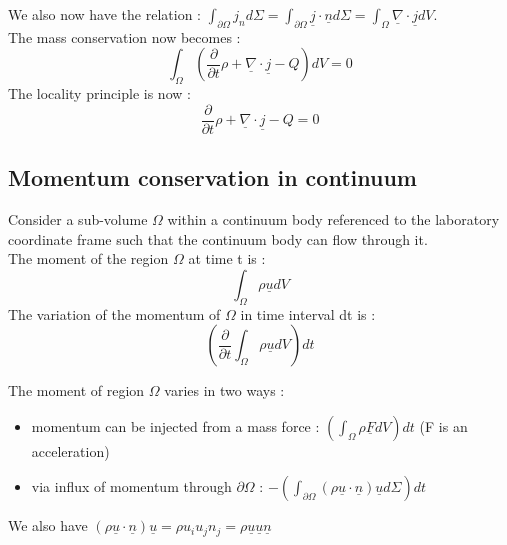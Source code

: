 \documentclass[../main.tex]{subfiles}
\begin{document}
We also now have the relation : $\int_{\partial \Omega} j_nd\Sigma = \int_{\partial \Omega} \underline{j}\cdot \underline{n}d\Sigma = \int_{\Omega} \underline{\nabla}\cdot \underline{j}dV$.\\

The mass conservation now becomes :\\
\begin{equation}
    \int_{\Omega}(\frac{\partial}{\partial t} \rho + \underline{\nabla}\cdot \underline{j} -Q)dV = 0
\end{equation}
The locality principle is now :\\
\begin{equation}
    \frac{\partial}{\partial t} \rho + \underline{\nabla}\cdot \underline{j} -Q = 0
\end{equation}

\subsection{Momentum conservation in continuum}
Consider a sub-volume $\Omega$ within a continuum body referenced to the laboratory coordinate frame such that the continuum body can flow through it.\\
The moment of the region $\Omega$ at time t is :\\
\begin{equation}
    \int_\Omega \rho \underline{u}dV
\end{equation}
The variation of the momentum of $\Omega$ in time interval dt is :\\
\begin{equation}
    (\frac{\partial}{\partial t} \int_\Omega \rho \underline{u} dV)dt
\end{equation}

The moment of region $\Omega$ varies in two ways :\\
\begin{itemize}
    \item momentum can be injected from a mass force : $(\int_\Omega \rho \underline{F}dV)dt$ (F is an acceleration)\\
    \item via influx of momentum through $\partial \Omega$ : $-(\int_{\partial\Omega} (\rho \underline{u} \cdot \underline{n})\underline{u}d\Sigma)dt$\\
\end{itemize}
We also have $(\rho \underline{u} \cdot \underline{n}) \underline{u} = \rho u_i u_j n_j = \rho \underline{u} \underline{u} \underline{n}$\\
\end{document}
